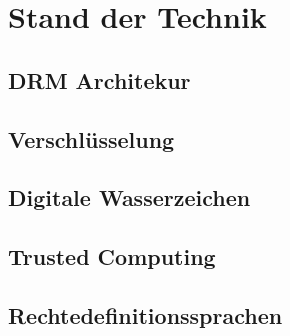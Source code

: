 \chapter{Stand der Technik}
\label{cha:stand_der_technik}

\section{DRM Architekur}
\label{subsec:DRM Architektur}

\section{Verschlüsselung}
\label{Verschlüsselung}

\section{Digitale Wasserzeichen}
\label{Digitales Wasserzeichen}

\section{Trusted Computing}
\label{Trusted Computing}

\section{Rechtedefinitionssprachen}
\label{Rechtedefinitionssprachen}


